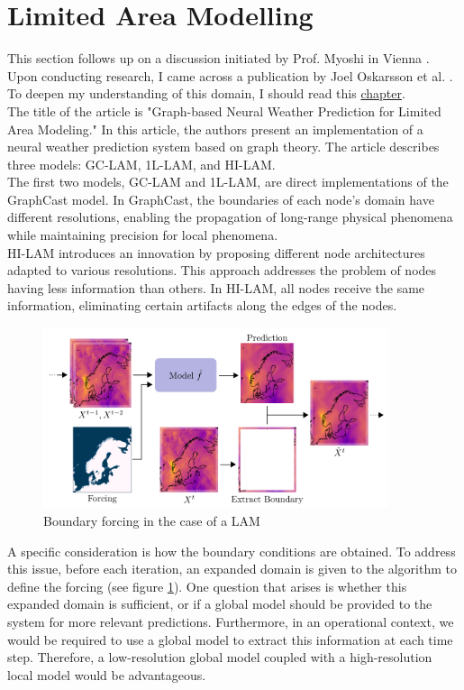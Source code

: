 \section{Limited Area Modelling}

This section follows up on a discussion initiated by Prof. Myoshi in Vienna \cite{Raynaud2024}. Upon conducting research, I came across a publication by Joel Oskarsson et al. \cite{LAM}. To deepen my understanding of this domain, I should read this \href{https://www.researchgate.net/publication/349484799}{chapter}.\\

The title of the article is "Graph-based Neural Weather Prediction for Limited Area Modeling." In this article, the authors present an implementation of a neural weather prediction system based on graph theory. The article describes three models: GC-LAM, 1L-LAM, and HI-LAM.\\

The first two models, GC-LAM and 1L-LAM, are direct implementations of the GraphCast model. In GraphCast, the boundaries of each node's domain have different resolutions, enabling the propagation of long-range physical phenomena while maintaining precision for local phenomena.\\

HI-LAM introduces an innovation by proposing different node architectures adapted to various resolutions. This approach addresses the problem of nodes having less information than others. In HI-LAM, all nodes receive the same information, eliminating certain artifacts along the edges of the nodes.\\

\begin{figure}[ht]
\centering
\includegraphics[width=0.9\textwidth]{media/LAM_Boundary-Forcing.png}
\caption{Boundary forcing in the case of a LAM}
\label{fig}
\end{figure}

A specific consideration is how the boundary conditions are obtained. To address this issue, before each iteration, an expanded domain is given to the algorithm to define the forcing (see figure \ref{fig}). One question that arises is whether this expanded domain is sufficient, or if a global model should be provided to the system for more relevant predictions. Furthermore, in an operational context, we would be required to use a global model to extract this information at each time step. Therefore, a low-resolution global model coupled with a high-resolution local model would be advantageous.